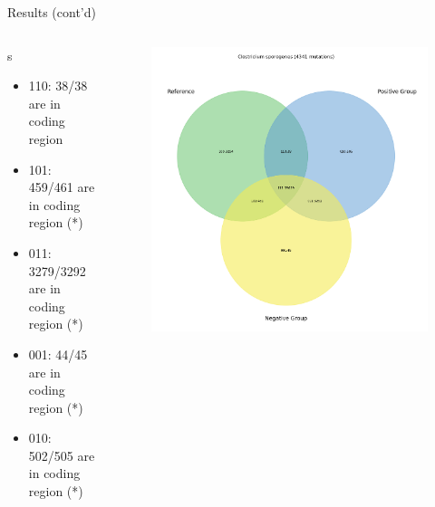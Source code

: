 \documentclass{beamer}
\begin{document}
\begin{frame}{Results (cont'd)}
	\begin{columns}
		\footnotesize{
			\begin{column}{.58\textwidth}
				s\textunderscore\@\textunderscore\@Clostridium\textunderscore\@sporogenes
				\begin{itemize}
					\item 110: 38/38 are in coding region
					\item 101: 459/461 are in coding region (*)
					\item 011: 3279/3292 are in coding region (*)
					\item 001: 44/45 are in coding region (*)
					\item 010: 502/505 are in coding region (*)
				\end{itemize}
			\end{column}
		}
		\begin{column}{.48\textwidth}
			\begin{figure}[ht]
				\centering
				\includegraphics[width=1\textwidth]{img/Clostridium-sporogenes-venn.png}
				\caption*{\label{fig:Clostridium-venn}}
			\end{figure}
		\end{column}
	\end{columns}
\end{frame}
\end{document}
